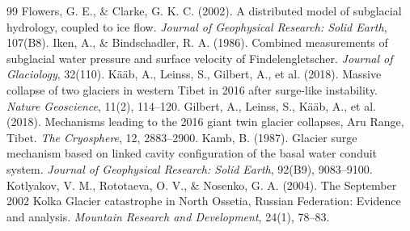 \documentclass[11pt,twocolumn]{article}
\begin{document}
\begin{thebibliography}{99}
 Flowers, G. E., \& Clarke, G. K. C. (2002). A distributed model of subglacial hydrology, coupled to ice flow. \textit{Journal of Geophysical Research: Solid Earth}, 107(B8).
 Iken, A., \& Bindschadler, R. A. (1986). Combined measurements of subglacial water pressure and surface velocity of Findelengletscher. \textit{Journal of Glaciology}, 32(110).
 K\"a\"ab, A., Leinss, S., Gilbert, A., et al. (2018). Massive collapse of two glaciers in western Tibet in 2016 after surge-like instability. \textit{Nature Geoscience}, 11(2), 114--120.
 Gilbert, A., Leinss, S., K\"a\"ab, A., et al. (2018). Mechanisms leading to the 2016 giant twin glacier collapses, Aru Range, Tibet. \textit{The Cryosphere}, 12, 2883--2900.
 Kamb, B. (1987). Glacier surge mechanism based on linked cavity configuration of the basal water conduit system. \textit{Journal of Geophysical Research: Solid Earth}, 92(B9), 9083--9100.
 Kotlyakov, V. M., Rototaeva, O. V., \& Nosenko, G. A. (2004). The September 2002 Kolka Glacier catastrophe in North Ossetia, Russian Federation: Evidence and analysis. \textit{Mountain Research and Development}, 24(1), 78--83.
\end{thebibliography}
\end{document}
